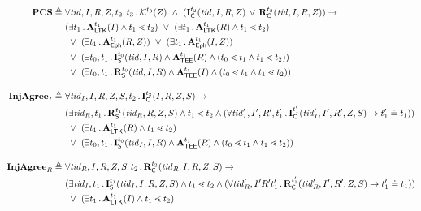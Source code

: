 \documentclass[runningheads]{llncs}
\begin{document}
\begin{figure*}[ht]
\begin{align*}
    \mPredPcs \triangleq\ & \forall \mTID, I, R, \mSessKey, t_2, t_3\mLogicDot
    \mK^{t_3}(\mSessKey)\  \land\ 
    (\mIComplete^{t_2}(\mTID, I, R, \mSessKey)\, \lor\, 
\mRComplete^{t_2}(\mTID, 
I, R, 
\mSessKey))
    \rightarrow\\
    &(\exists t_1\mLogicDot \mRevLTK^{t_1}(I) \land t_1 \lessdot t_2)
    \ \lor\ (\exists t_1\mLogicDot \mRevLTK^{t_1}(R) \land t_1 \lessdot t_2)\\
    &\ \lor\ (\exists t_1\mLogicDot \mRevEph^{t_1}(R, \mSessKey))
    \ \lor\ (\exists t_1\mLogicDot \mRevEph^{t_1}(I, \mSessKey))\\
	&\ \lor\ (\exists t_0, t_1\mLogicDot \mIStart^{t_0}(\mTID, I, R) \land 
\mTEE^{t_1}(R) \land (t_0 \lessdot t_1 \land t_1 \lessdot t_2))\\
    &\ \lor\ (\exists t_0, t_1\mLogicDot \mRStart^{t_0}(\mTID, I, R) 
\land \mTEE^{t_1}(I) \land (t_0 \lessdot t_1 \land t_1 \lessdot t_2))\\[1em]
%
    \mPredInjI \triangleq\ &
    \forall \mTID_I, I, R, \mSessKey, S, t_2\mLogicDot \mIComplete^{t_2}(I, R, 
\mSessKey, S)
    \rightarrow\\
    &(\exists \mTID_R, t_1\mLogicDot \mRStart^{t_1}(\mTID_R, R, \mSessKey, 
S) \land t_1 \lessdot t_2
    \land (\forall \mTID_I', I', R', t_1' \mLogicDot \mIComplete^{t_1'}(\mTID_I', 
I' , R', \mSessKey, S)
        \rightarrow t_1' \doteq t_1))\\
    &\ \lor\ (\exists t_1\mLogicDot \mRevLTK^{t_1}(R) \land t_1 \lessdot t_2)\\
    &\ \lor\ (\exists t_0, t_1\mLogicDot \mIStart^{t_0}(\mTID_I, I, R) \land 
\mTEE^{t_1}(R) \land (t_0 \lessdot t_1 \land t_1 \lessdot t_2))\\[1em]
%
    \mPredInjR \triangleq\ &
    \forall \mTID_R, I, R, \mSessKey, S, t_2\mLogicDot 
\mRComplete^{t_2}(\mTID_R, 
I, R, 
\mSessKey, S)
    \rightarrow\\
    &(\exists \mTID_I, t_1\mLogicDot \mIStart^{t_1}(\mTID_I, I, R, \mSessKey, 
S) \land t_1 \lessdot t_2
    \land (\forall \mTID_R', I' R' t_1' \mLogicDot 
\mRComplete^{t_1'}(\mTID_R', 
I' , R', \mSessKey, S)
        \rightarrow t_1' \doteq t_1))\\
    &\ \lor\ (\exists t_1\mLogicDot \mRevLTK^{t_1}(I) \land t_1 \lessdot t_2)\\

\end{align*}
\end{figure*}
\end{document}
